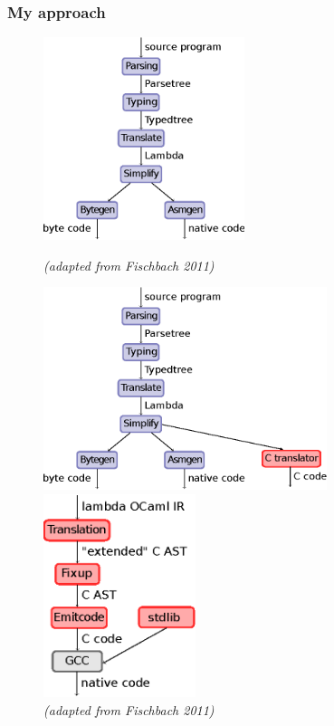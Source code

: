 \documentclass[xcolor={usenames,dvipsnames,svgnames,table}]{beamer}
\begin{document}
\begin{frame}
  \frametitle{My approach}


\begin{figure}[H]
  \begin{overprint}
  \centering
  \includegraphics[height=16em]{presentation_2alt}

  \caption{\tiny\textit{(adapted from Fischbach 2011)}}

  \centering
  \includegraphics[height=16em]{presentation_2}

  \caption{\tiny\textit{(adapted from Fischbach 2011)}}

  \centering
  \includegraphics[height=16em]{presentation_3}
\end{overprint}
\end{figure}

\end{frame}
\end{document}
